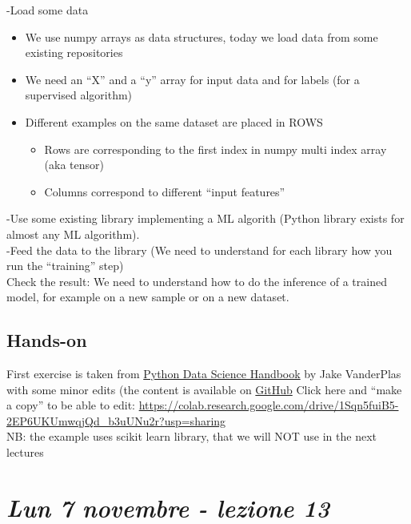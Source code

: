 -Load some data
\begin{itemize}
	\item We use numpy arrays as data structures, today we load data from some existing repositories
	\item We need an “X” and a “y” array for input data and for labels (for a supervised algorithm)
	\item Different examples on the same dataset are placed in ROWS
	\begin{itemize}
		\item Rows are corresponding to the first index in numpy multi index array (aka tensor)
		\item Columns correspond to different “input features”
	\end{itemize}
\end{itemize}

-Use some existing library implementing a ML algorith (Python library exists for almost any ML algorithm).\\

-Feed the data to the library (We need to understand for each library how you run the “training” step)\\

Check the result: We need to understand how to do the inference of a trained model, for example on a new sample or on a new dataset.

\subsection{Hands-on}


First exercise is taken from \href{http://shop.oreilly.com/product/0636920034919.do}{Python Data Science Handbook} by Jake
VanderPlas with some minor edits (the content is available on \href{https://github.com/jakevdp/PythonDataScienceHandbook}{GitHub} 
Click here and “make a copy” to be able to edit: \url{https://colab.research.google.com/drive/1Sqn5fuiB5-2EP6UKUmwqjQd_b3uUNu2r?usp=sharing}\\
NB: the example uses scikit learn library, that we will NOT use in the next lectures




\section{\textit{Lun 7 novembre - lezione 13}}

